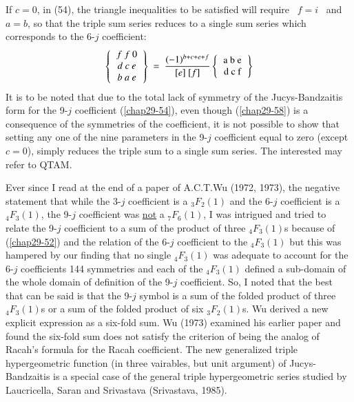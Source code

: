 If $c=0$, in (54), the triangle inequalities to be satisfied will require \ $f=i$ \ and \ $a=b$, so that the triple sum series reduces to a single sum series which corresponds to the 6-$j$ coefficient:
\begin{equation}
\left\{
\begin{tabular}{c}
$f \ f \ 0$\\  
$d \ c\ e$\\ 
$b \ a \ e$\\ 
\end{tabular} 
\right\} \
=\ \frac{(-1)^{b+c+e+f}}{[e]\ [f]}
\left\{
\begin{tabular} {c} 
a\ b\ e\\ 
d\ c\ f \\ 
\end{tabular} 
\right\} \label{chap29-eq58}
\end{equation}
It is to be noted that due to the total lack of symmetry of the Jucys-Bandzaitis form for the 9-$j$ coefficient (\eqref{chap29-54}), even though (\eqref{chap29-58}) is a consequence of the symmetries of the coefficient, it is not possible to show that setting any one of the nine parameters in the 9-$j$ coefficient equal to zero (except $c=0$), simply reduces the triple sum to a single sum series. The interested may refer to QTAM.

Ever since I read at the end of a paper of A.C.T.Wu (1972, 1973), the negative statement that while the 3-$j$ coefficient is a $_3F_2(1)$ and the 6-$j$ coefficient is a $_4F_3(1)$, the 9-$j$ coefficient was \underline{not} a $_7F_6(1)$, I was intrigued and tried to relate the 9-$j$ coefficient to a sum of the product of three $_4F_3(1)$s because of (\eqref{chap29-52}) and the relation of the 6-$j$ coefficient to the $_4F_3(1)$ but this was hampered by our finding that no single $_4F_3(1)$ was adequate to account for the 6-$j$ coefficients 144 symmetries and each of the $_4F_3(1)$ defined a sub-domain of the whole domain of definition of the  9-$j$ coefficient. So, I noted that the best that can be said is that the 9-$j$ symbol is a sum of the folded product of three $_4F_3(1)$s or a sum of the folded product of six $_3F_2(1)$s. Wu derived a new explicit expression as a six-fold sum. Wu (1973) examined his earlier paper and found the six-fold sum does not satisfy the criterion of being the analog of Racah's formula for the Racah coefficient. The new generalized triple hypergeometric function (in three vairables, but unit argument) of Jucys-Bandzaitis is a special case of the general triple hypergeometric series studied by Laucricella, Saran and Srivastava (Srivastava, 1985).

